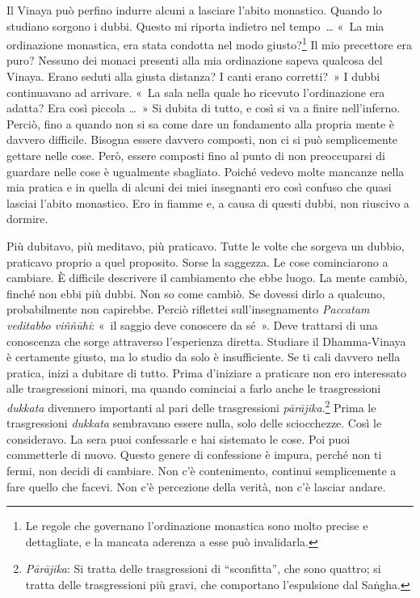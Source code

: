 Il Vinaya può perfino indurre alcuni a lasciare l'abito monastico.
Quando lo studiano sorgono i dubbi. Questo mi riporta indietro nel
tempo~\ldots{} «~La mia ordinazione monastica, era stata condotta nel modo
giusto?\footnote{Le regole che governano l'ordinazione monastica sono
  molto precise e dettagliate, e la mancata aderenza a esse può
  invalidarla.} Il mio precettore era puro? Nessuno dei monaci presenti
alla mia ordinazione sapeva qualcosa del Vinaya. Erano seduti alla
giusta distanza? I canti erano corretti?~» I dubbi continuavano ad
arrivare. «~La sala nella quale ho ricevuto l'ordinazione era adatta?
Era così piccola \ldots{}~» Si dubita di tutto, e così si va a finire
nell'inferno. Perciò, fino a quando non si sa come dare un fondamento
alla propria mente è davvero difficile. Bisogna essere davvero composti,
non ci si può semplicemente gettare nelle cose. Però, essere composti
fino al punto di non preoccuparsi di guardare nelle cose è ugualmente
sbagliato. Poiché vedevo molte mancanze nella mia pratica e in quella di
alcuni dei miei insegnanti ero così confuso che quasi lasciai l'abito
monastico. Ero in fiamme e, a causa di questi dubbi, non riuscivo a
dormire.

Più dubitavo, più meditavo, più praticavo. Tutte le volte che sorgeva un
dubbio, praticavo proprio a quel proposito. Sorse la saggezza. Le cose
cominciarono a cambiare. È difficile descrivere il cambiamento che ebbe
luogo. La mente cambiò, finché non ebbi più dubbi. Non so come cambiò.
Se dovessi dirlo a qualcuno, probabilmente non capirebbe. Perciò
riflettei sull'insegnamento \emph{Paccatam veditabbo viññūhi}: «~il
saggio deve conoscere da sé~». Deve trattarsi di una conoscenza che
sorge attraverso l'esperienza diretta. Studiare il Dhamma-Vinaya è
certamente giusto, ma lo studio da solo è insufficiente. Se ti cali
davvero nella pratica, inizi a dubitare di tutto. Prima d'iniziare a
praticare non ero interessato alle trasgressioni minori, ma quando
cominciai a farlo anche le trasgressioni \emph{dukkata} divennero
importanti al pari delle trasgressioni \emph{pārājika}.\footnote{\emph{Pārājika}:
  Si tratta delle trasgressioni di ``sconfitta'', che sono quattro; si
  tratta delle trasgressioni più gravi, che comportano l'espulsione dal
  Saṅgha.} Prima le trasgressioni \emph{dukkata} sembravano essere
nulla, solo delle sciocchezze. Così le consideravo. La sera puoi
confessarle e hai sistemato le cose. Poi puoi commetterle di nuovo.
Questo genere di confessione è impura, perché non ti fermi, non decidi
di cambiare. Non c'è contenimento, continui semplicemente a fare quello
che facevi. Non c'è percezione della verità, non c'è lasciar andare.


